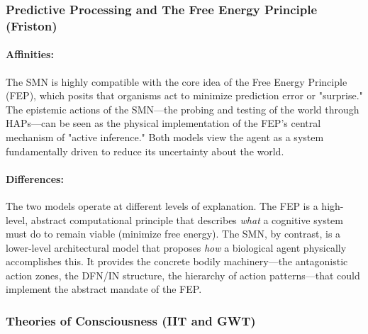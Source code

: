 \subsubsection{Predictive Processing and The Free Energy Principle (Friston)}\label{ssubsec:fep}
\paragraph{Affinities:} The SMN is highly compatible with the core idea of the Free Energy Principle (FEP), which posits that organisms act to minimize prediction error or "surprise." The epistemic actions of the SMN—the probing and testing of the world through HAPs—can be seen as the physical implementation of the FEP's central mechanism of "active inference." Both models view the agent as a system fundamentally driven to reduce its uncertainty about the world.
\paragraph{Differences:} The two models operate at different levels of explanation. The FEP is a high-level, abstract computational principle that describes \textit{what} a cognitive system must do to remain viable (minimize free energy). The SMN, by contrast, is a lower-level architectural model that proposes \textit{how} a biological agent physically accomplishes this. It provides the concrete bodily machinery—the antagonistic action zones, the DFN/IN structure, the hierarchy of action patterns—that could implement the abstract mandate of the FEP.\subsubsection{Theories of Consciousness (IIT and GWT)} \label{ssubsec:consciousness_theories}
